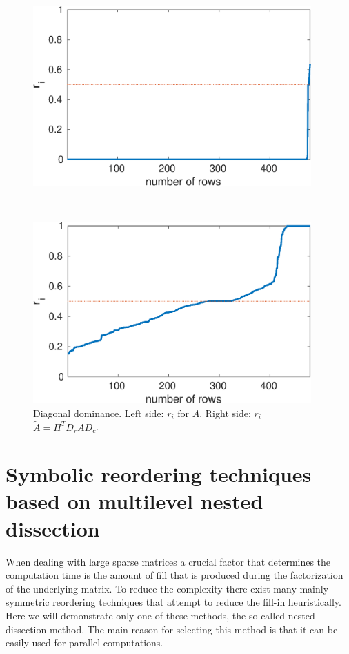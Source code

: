 \begin{figure}
 \centering
\begin{minipage}{.48\textwidth}
 \begin{center}
%
\includegraphics[width=0.95\textwidth,height=0.5\textwidth]{figures/west0479-dd} 
 \end{center}
\end{minipage}
~
\begin{minipage}{.48\textwidth}
  \begin{center}
%
\includegraphics[width=0.95\textwidth,height=0.5\textwidth]{figures/west0479-match-dd} 
 \end{center}  
\end{minipage}
    \caption{Diagonal dominance. Left side: $r_i$ for $A$. Right side: $r_i$  $\tilde A=\Pi^TD_rAD_c$.}
    \label{fig:mwm-dd}
\end{figure}

\section[Symbolic reordering techniques based on nested dissection]{Symbolic reordering techniques based on multilevel nested dissection}
\label{sec:reordering}
When dealing with large sparse matrices a crucial factor that determines
the computation time is the amount of fill that is produced during the
factorization of the underlying matrix. To reduce the complexity there
exist many mainly symmetric reordering techniques that attempt to reduce
the fill-in heuristically. Here we will demonstrate only one of these
methods, the so-called nested dissection method. The main reason for selecting
this method is that it can be easily used for parallel computations.

